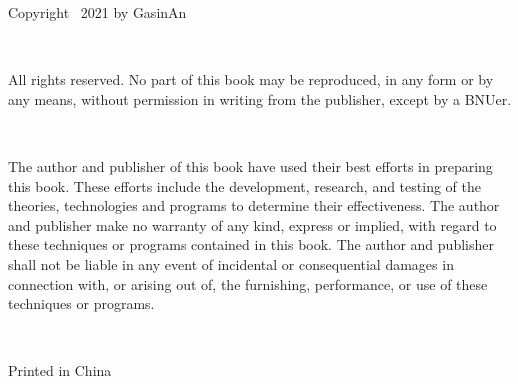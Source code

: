 \noindent Copyright \textcopyright~2021 by GasinAn

\ 

\noindent All rights reserved. No part of this book may be reproduced, in any form or by any means, without permission in writing from the publisher, except by a BNUer.

\ 

\noindent The author and publisher of this book have used their best efforts in preparing this book. These efforts include the development, research, and testing of the theories, technologies and programs to determine their effectiveness. The author and publisher make no warranty of any kind, express or implied, with regard to these techniques or programs contained in this book. The author and publisher shall not be liable in any event of incidental or consequential damages in connection with, or arising out of, the furnishing, performance, or use of these techniques or programs.

\ 

\noindent Printed in China
